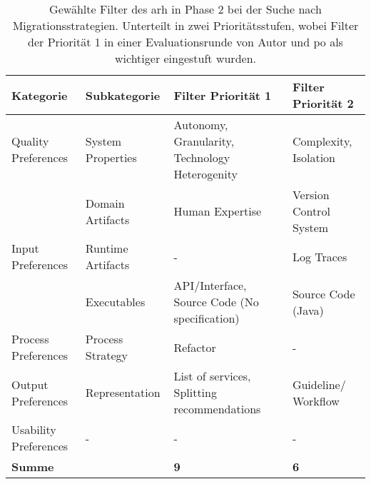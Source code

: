 \begin{table}[!h]
  \centering
  \begin{tabular}{m{3cm} l m{4cm} m{3.5cm}}
    \toprule
    \textbf{Kategorie} & \textbf{Subkategorie} & \textbf{Filter Priorität 1} & \textbf{Filter Priorität 2} \\ \midrule
    Quality Preferences & System Properties & Autonomy, Granularity, Tech\-nology Heterogenity & Complexity, Isolation \\ \hline
    & Domain Artifacts & Human Expertise & Version Control Sys\-tem \\
    Input Preferences & Runtime Artifacts & - & Log Traces \\
     & Executables & API/Interface, Source Code (No specifica\-tion) & Source Code (Java) \\ \hline
    Process Preferences & Process Strategy & Refactor & - \\ \hline
    Output Preferences & Representation & List of services, Split\-ting recommendations & Guideline/ Workflow \\ \hline
    Usability Preferences & - & - & - \\ \midrule
    \multicolumn{2}{l}{\textbf{Summe}} &\textbf{9} & \textbf{6} \\ \bottomrule
  \end{tabular}
  \caption[Gewählte Filter des \gls{arh} in Phase 2]{
    Gewählte Filter des \gls{arh} in Phase 2 bei der Suche nach Migrationsstrategien.
    Unterteilt in zwei Prioritätsstufen, wobei Filter der Priorität 1 in einer Evaluationsrunde von Autor und \gls{po} als wichtiger eingestuft wurden.
  }
  \label{tab:phase2-selected-filter}
\end{table}
